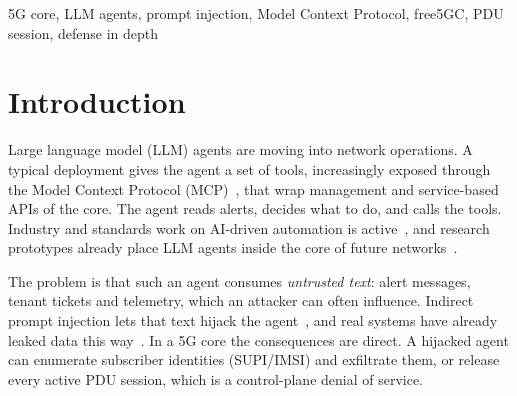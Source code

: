 \documentclass[conference]{IEEEtran}
\begin{document}
\begin{abstract}
ticket passes it, and L3, which trusts nothing the call carries, slows the attack to its rate
budget of 3 sessions per 60\,s window; an offline test shows the same for a genuine capability
misused by a hijacked agent. The full gateway
produces no false positives on four benign tasks that release at most one session each, but its
rate cap blocks a legitimate bulk maintenance task after three releases. It adds a median of
0.04\,ms to ordinary calls; a release it lets through costs a median of 13\,ms more
(9--27\,ms, against about 5\,s for the release itself), spent querying the core. The procedure
state machine is enforced and general across procedures, but on free5GC's release path it is
redundant with the SMF, which already rejects the only out-of-order call; its protective value
is therefore shown only offline and on other procedures. Offline
experiments add a rate-cap trade-off curve, an
adaptive-attacker analysis that marks where the defense stops holding (slow drip), and
evidence that new procedures and tools are protected by configuration alone.
\end{abstract}

\begin{IEEEkeywords}
5G core, LLM agents, prompt injection, Model Context Protocol, free5GC, PDU session, defense in depth
\end{IEEEkeywords}

\section{Introduction}

Large language model (LLM) agents are moving into network operations. A typical
deployment gives the agent a set of tools, increasingly exposed through the Model
Context Protocol (MCP)~\cite{mcp2025}, that wrap management and service-based APIs of the
core. The agent reads alerts, decides what to do, and calls the tools. Industry and
standards work on AI-driven automation is active~\cite{ts28105,zsm012}, and research
prototypes already place LLM agents inside the core of future networks~\cite{jiang2026}.

The problem is that such an agent consumes \emph{untrusted text}: alert messages, tenant
tickets and telemetry, which an attacker can often influence. Indirect prompt injection
lets that text hijack the agent~\cite{greshake2023}, and real systems have already leaked
data this way~\cite{echoleak2025}. In a 5G core the consequences are direct. A hijacked
agent can enumerate subscriber identities (SUPI/IMSI) and exfiltrate them, or release every
active PDU session, which is a control-plane denial of service.
\end{document}
